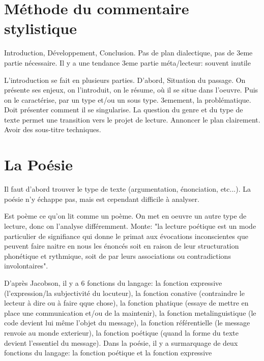 \documentclass[a4paper]{report}
\theoremstyle{definition}
\theoremstyle{remark}
\begin{document}
\section{Méthode du commentaire stylistique} 
Introduction, Développement, Conclusion. Pas de plan dialectique, pas de 3eme partie nécessaire. Il y a une tendance 3eme partie méta/lecteur: souvent inutile \par

L'introduction se fait en plusieurs parties. D'abord, Situation du passage. On présente ses enjeux, on l'introduit, on le résume, où il se situe dans l'oeuvre. Puis on le caractérise, par un type et/ou un sous type. 3emement, la problématique. Doit présenter comment il se singularise. La question du genre et du type de texte permet une transition vers le projet de lecture. Annoncer le plan clairement. Avoir des sous-titre techniques.

\section{La Poésie}

Il faut d'abord trouver le type de texte (argumentation, énonciation, etc...). La poésie n'y échappe pas, mais est cependant difficile à analyser.\par \bigskip

Est poème ce qu'on lit comme un poème. On met en oeuvre un autre type de lecture, donc on l'analyse différemment. Monte: "la lecture poétique est un mode particulier de signifiance qui donne le primat aux évocations inconscientes que peuvent faire naitre en nous les énoncés soit en raison de leur structuration phonétique et rythmique, soit de par leurs associations ou contradictions involontaires". \par \medskip 


D'après Jacobson, il y a 6 fonctions du langage: la fonction expressive (l'expression/la subjectivité du locuteur), la fonction conative (contraindre le lecteur à dire ou à faire qque chose), la fonction phatique (essaye de mettre en place une communication et/ou de la maintenir), la fonction metalinguistique (le code devient lui même l'objet du message), la fonction référentielle (le message renvoie au monde exterieur), la fonction poétique (quand la forme du texte devient l'essentiel du message). Dans la poésie, il y a surmarquage de deux fonctions du langage: la fonction poétique et la fonction expressive\par \medskip 
\end{document}
